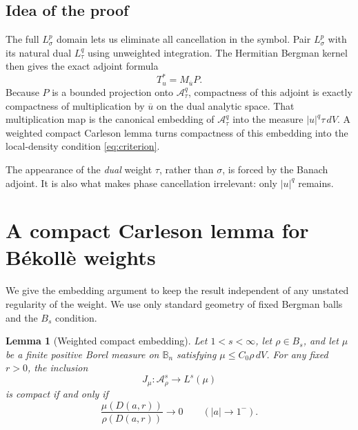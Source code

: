 \documentclass[11pt]{article}
\newtheorem{lemma}[theorem]{Lemma}
\newcommand{\B}{\mathbb B_n}
\newcommand{\A}{\mathcal A}
\begin{document}
\subsection*{Idea of the proof}

The full $L^p_\sigma$ domain lets us eliminate all cancellation in the
symbol.  Pair $L^p_\sigma$ with its natural dual $L^q_\tau$ using
unweighted integration.  The Hermitian Bergman kernel then gives the exact
adjoint formula
\[
                    T_u^*=M_{\overline u}P.
\]
Because $P$ is a bounded projection onto $\A^q_\tau$, compactness of this
adjoint is exactly compactness of multiplication by $\overline u$ on the
dual analytic space.  That multiplication map is the canonical embedding
of $\A^q_\tau$ into the measure
$|u|^q\tau\,dV$.  A weighted compact Carleson lemma turns compactness of
this embedding into the local-density condition \eqref{eq:criterion}.

The appearance of the \emph{dual} weight $\tau$, rather than $\sigma$, is
forced by the Banach adjoint.  It is also what makes phase cancellation
irrelevant: only $|u|^q$ remains.

\section{A compact Carleson lemma for B\'ekoll\`e weights}

We give the embedding argument to keep the result independent of any
unstated regularity of the weight.  We use only standard geometry of fixed
Bergman balls and the $B_s$ condition.

\begin{lemma}[Weighted compact embedding]\label{lem:carleson}
Let $1<s<\infty$, let $\rho\in B_s$, and let $\mu$ be a finite positive
Borel measure on $\B$ satisfying $\mu\le C_0\rho\,dV$.  For any fixed
$r>0$, the inclusion
\[
              J_\mu:\A^s_\rho\longrightarrow L^s(\mu)
\]
is compact if and only if
\begin{equation}\label{eq:density}
       \frac{\mu(D(a,r))}{\rho(D(a,r))}\longrightarrow0
       \qquad (|a|\to1^-).
\end{equation}
\end{lemma}
\end{document}
